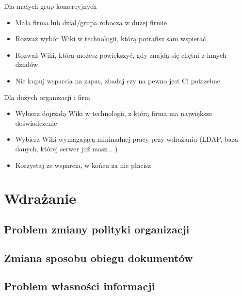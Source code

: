 \documentclass{article}
\begin{document}
		Dla małych grup komercyjnych
		\begin{itemize}
			\item Mała firma lub dział/grupa robocza w dużej firmie
			\item Rozważ wybór Wiki w technologii, którą potrafisz sam wspierać
			\item Rozważ Wiki, którą możesz powiększyć, gdy znajdą się chętni z innych działów
			\item Nie kupuj wsparcia na zapas, zbadaj czy na pewno jest Ci potrzebne
		\end{itemize}
		Dla dużych organizacji i firm
		\begin{itemize}
			\item Wybierz dojrzałą Wiki w technologii, z którą firma ma największe doświadczenie 
			\item Wybierz Wiki wymagającą minimalnej pracy przy wdrażaniu (LDAP, baza danych, której serwer już masz... ) 
			\item Korzystaj ze wsparcia, w końcu za nie płacisz
		\end{itemize}
\newpage
\section{Wdrażanie}
	\subsection{Problem zmiany polityki organizacji}
	\subsection{Zmiana sposobu obiegu dokumentów}
	
	\subsection{Problem własności informacji}
\end{document}
